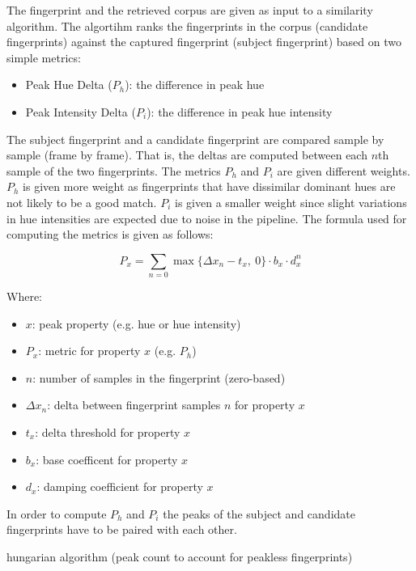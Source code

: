 \documentclass[thesis.tex]{subfiles}
\begin{document}
The fingerprint and the retrieved corpus are given as input to a similarity algorithm. The algortihm ranks the fingerprints in the corpus (candidate fingerprints) against the captured fingerprint (subject fingerprint) based on two simple metrics:

\begin{itemize}
	\item Peak Hue Delta ($P_h$): the difference in peak hue
	\item Peak Intensity Delta ($P_i$): the difference in peak hue intensity
\end{itemize}

The subject fingerprint and a candidate fingerprint are compared sample by sample (frame by frame). That is, the deltas are computed between each $n$th sample of the two fingerprints. The metrics $P_h$ and $P_i$ are given different weights. $P_h$ is given more weight as fingerprints that have dissimilar dominant hues are not likely to be a good match. $P_i$ is given a smaller weight since slight variations in hue intensities are expected due to noise in the pipeline. The formula used for computing the metrics is given as follows:

\begin{equation}
\label{equation:fingerprint-penalty}
	P_x = \sum \limits_{n=0} { \max \{\Delta{x_n}-t_x,\ 0\} \cdot b_x \cdot d_x^n }
\end{equation}

Where:
\begin{itemize}[label=]
	\item $x$: peak property (e.g. hue or hue intensity)
    \item $P_x$: metric for property $x$ (e.g. $P_h$)
    \item $n$: number of samples in the fingerprint (zero-based)
    \item $\Delta{x_n}$: delta between fingerprint samples $n$ for property $x$
    \item $t_x$: delta threshold for property $x$
    \item $b_x$: base coefficent for property $x$
    \item $d_x$: damping coefficient for property $x$
\end{itemize}

In order to compute $P_h$ and $P_i$ the peaks of the subject and candidate fingerprints have to be paired with each other.

hungarian algorithm (peak count to account for peakless fingerprints)
\end{document}
